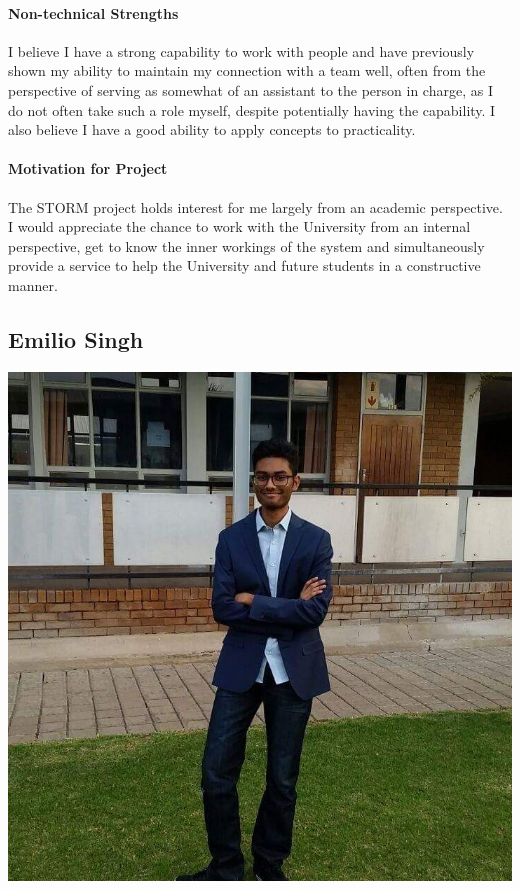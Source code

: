\documentclass[12pt]{article}
\begin{document}
\paragraph{Non-technical Strengths}
I believe I have a strong capability to work with people and have previously shown my ability to maintain my connection with a team well, often from the perspective of serving as somewhat of an assistant to the person in charge, as I do not often take such a role myself, despite potentially having the capability. 
\newline I also believe I have a good ability to apply concepts to practicality.
\paragraph{Motivation for Project}
The STORM project holds interest for me largely from an academic perspective. I would appreciate the chance to work with the University from an internal perspective, get to know the inner workings of the system and simultaneously provide a service to help the University and future students in a constructive manner. 

\subsection{Emilio Singh}
\includegraphics[scale=0.2]{Emilio}
\end{document}
